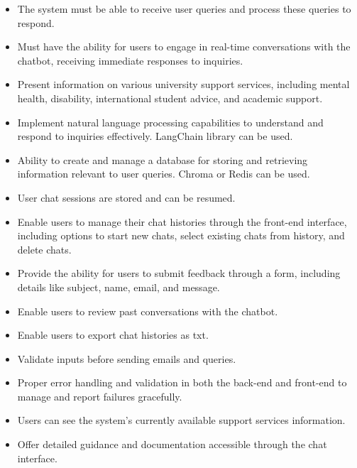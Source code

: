 \documentclass{l4proj}
\begin{document}
\begin{itemize}
    \item The system must be able to receive user queries and process these queries to respond.

    \item Must have the ability for users to engage in real-time conversations with the chatbot, receiving immediate responses to inquiries.
    
    \item Present information on various university support services, including mental health, disability, international student advice, and academic support.

    \item Implement natural language processing capabilities to understand and respond to inquiries effectively. LangChain library can be used.
    
    \item Ability to create and manage a database for storing and retrieving information relevant to user queries. Chroma or Redis can be used.

    \item User chat sessions are stored and can be resumed.

    \item Enable users to manage their chat histories through the front-end interface, including options to start new chats, select existing chats from history, and delete chats.

    \item Provide the ability for users to submit feedback through a form, including details like subject, name, email, and message.
    
    \item Enable users to review past conversations with the chatbot.

    \item Enable users to export chat histories as txt.

    \item Validate inputs before sending emails and queries.

    \item Proper error handling and validation in both the back-end and front-end to manage and report failures gracefully.
    
    \item Users can see the system's currently available support services information.

    \item Offer detailed guidance and documentation accessible through the chat interface.
    

\end{itemize}
\end{document}
